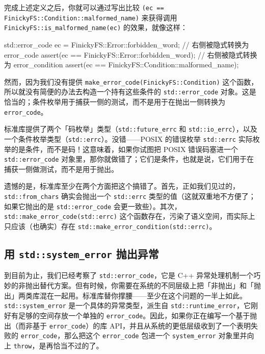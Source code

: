 完成上述定义之后，你就可以通过写出比较 \texttt{(\allowbreak{}ec == Finicky\allowbreak{}FS::\allowbreak{}Condition::\allowbreak{}malformed\_\allowbreak{}name)\allowbreak{}} 来获得调用 \texttt{Finicky\allowbreak{}FS::\allowbreak{}is\_\allowbreak{}malformed\_\allowbreak{}name(\allowbreak{}ec)\allowbreak{}} 的效果，就像这样：

\begin{codebox}[cpp]
     std::error_code ec = FinickyFS::Error::forbidden_word;
       // 右侧被隐式转换为 error_code
     assert(ec == FinickyFS::Error::forbidden_word);
       // 右侧被隐式转换为 error_condition
     assert(ec == FinickyFS::Condition::malformed_name);
\end{codebox}

然而，因为我们没有提供 \texttt{make\_\allowbreak{}error\_\allowbreak{}code(\allowbreak{}Finicky\allowbreak{}FS::\allowbreak{}Condition)\allowbreak{}} 这个函数，所以就没有简便的办法去构造一个持有这些条件的 \texttt{std::\allowbreak{}error\_\allowbreak{}code} 对象。这是恰当的；条件枚举用于捕获一侧的测试，而不是用于在抛出一侧转换为 \texttt{error\_\allowbreak{}code}。

标准库提供了两个「码枚举」类型（\texttt{std::\allowbreak{}future\_\allowbreak{}errc} 和 \texttt{std::\allowbreak{}io\_\allowbreak{}errc}），以及一个条件枚举类型（\texttt{std::\allowbreak{}errc}）。没错——POSIX 的错误枚举 \texttt{std::\allowbreak{}errc} 实际枚举的是条件，而不是码！这意味着，如果你试图把 POSIX 错误码塞进一个 \texttt{std::\allowbreak{}error\_\allowbreak{}code} 对象里，那你就做错了；它们是条件，也就是说，它们用于在捕获一侧做测试，而不是用于抛出。

遗憾的是，标准库至少在两个方面把这个搞错了。首先，正如我们见过的，\texttt{std::\allowbreak{}from\_\allowbreak{}chars} 确实会抛出一个 \texttt{std::\allowbreak{}errc} 类型的值（这就双重地不方便了；如果它抛出的是 \texttt{std::\allowbreak{}error\_\allowbreak{}code} 会更一致些）。其次，\texttt{std::\allowbreak{}make\_\allowbreak{}error\_\allowbreak{}code(\allowbreak{}std::\allowbreak{}errc)\allowbreak{}} 这个函数存在，污染了语义空间，而实际上只应该（也确实）存在 \texttt{std::\allowbreak{}make\_\allowbreak{}error\_\allowbreak{}condition(\allowbreak{}std::\allowbreak{}errc)\allowbreak{}}。

\subsection{用 \texttt{std::\allowbreak{}system\_\allowbreak{}error} 抛出异常}

到目前为止，我们已经考察了 \texttt{std::\allowbreak{}error\_\allowbreak{}code}，它是 C++ 异常处理机制一个巧妙的非抛出替代方案。但有时候，你需要在系统的不同层级上把「非抛出」和「抛出」两类库混在一起用。标准库替你撑腰——至少在这个问题的一半上如此。\texttt{std::\allowbreak{}system\_\allowbreak{}error} 是一个具体的异常类型，派生自 \texttt{std::\allowbreak{}runtime\_\allowbreak{}error}，它刚好有足够的空间存放一个单独的 \texttt{error\_\allowbreak{}code}。因此，如果你正在编写一个基于抛出（而非基于 \texttt{error\_\allowbreak{}code}）的库 API，并且从系统的更低层级收到了一个表明失败的 \texttt{error\_\allowbreak{}code}，那么把这个 \texttt{error\_\allowbreak{}code} 包进一个 \texttt{system\_\allowbreak{}error} 对象里并向上 \texttt{throw}，是再恰当不过的了。

